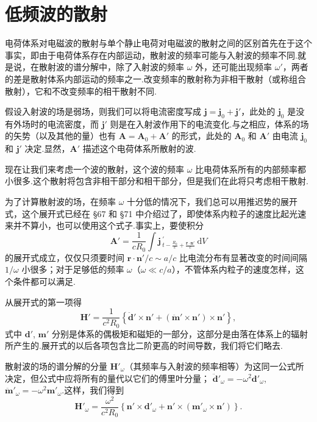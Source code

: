 \section{低频波的散射}

电荷体系对电磁波的散射与单个静止电荷对电磁波的散射之间的区别首先在于这个事实，即由于电荷体系存在内部运动，散射波的频率可能与入射波的频率不同.就是说，在散射波的谱分解中，除了入射波的频率 $\omega$ 外，还可能出现频率 $\omega'$，两者的差是散射体系内部运动的频率之一.改变频率的散射称为非相干散射（或称组合散射），它和不改变频率的相干散射不同.

假设入射波的场是弱场，则我们可以将电流密度写成 $\boldsymbol{j}=\boldsymbol{j}_0+\boldsymbol{j}'$，此处的 $\boldsymbol{j}_0$ 是没有外场时的电流密度，而 $\boldsymbol{j}'$ 则是在入射波作用下的电流变化.与之相应，体系的场的矢势（以及其他的量）也有 $\boldsymbol{A}=\boldsymbol{A}_0+\boldsymbol{A}'$ 的形式，此处的 $\boldsymbol{A}_0$ 和 $\boldsymbol{A}'$ 由电流 $\boldsymbol{j}_0$ 和 $\boldsymbol{j}'$ 决定.显然，$\boldsymbol{A}'$ 描述这个电荷体系所散射的波.

现在让我们来考虑一个波的散射，这个波的频率 $\omega$ 比电荷体系所有的内部频率都小很多.这个散射将包含非相干部分和相干部分，但是我们在此将只考虑相干散射.

为了计算散射波的场，在频率 $\omega$ 十分低的情况下，我们总可以用推迟势的展开式，这个展开式已经在 §67 和 §71 中介绍过了，即使体系内粒子的速度比起光速来并不算小，也可以使用这个式子.事实上，要使积分
\begin{equation}
  \boldsymbol{A}'=\frac{1}{cR_0}\int
  \boldsymbol{j}\,_{t-\frac{R_0}{c}+\frac{\boldsymbol{r}\cdot\boldsymbol{n}'}{c}}^{\prime}\,
  \mathrm{d}V
\end{equation}
的展开式成立，仅仅只须要时间 $\boldsymbol{r}\cdot\boldsymbol{n}'/c\sim a/c$ 比电流分布有显著改变的时间间隔 $1/\omega$ 小很多；对于足够低的频率 $\omega$（$\omega\ll c/a$），不管体系内粒子的速度怎样，这个条件都可以满足.

从展开式的第一项得
\begin{equation*}
  \boldsymbol{H}'=\frac{1}{c^2R_0}
  \left\{\ddot{\boldsymbol{d}}'\times\boldsymbol{n}'
  +(\ddot{\boldsymbol{m}}'\times\boldsymbol{n}')\times\boldsymbol{n}'\right\},
\end{equation*}
式中 $\boldsymbol{d}'$, $\boldsymbol{m}'$ 分别是体系的偶极矩和磁矩的一部分，这部分是由落在体系上的辐射所产生的.展开式的以后各项包含比二阶更高的时间导数，我们将它们略去.

散射波的场的谱分解的分量 $\boldsymbol{H}'_{\omega}$（其频率与入射波的频率相等）为这同一公式所决定，但公式中应将所有的量代以它们的傅里叶分量；
$\ddot{\boldsymbol{d}}'_{\omega}=-\omega^2\boldsymbol{d}'_{\omega}$,
$\ddot{\boldsymbol{m}}'_{\omega}=-\omega^2\boldsymbol{m}'_{\omega}$.这样，我们得到
\begin{equation}
  \boldsymbol{H}'_{\omega}=\frac{\omega^2}{c^2R_0}
  \left\{\boldsymbol{n}'\times\boldsymbol{d}'_{\omega}
  +\boldsymbol{n}'\times(\boldsymbol{m}'_{\omega}\times\boldsymbol{n}')\right\}.
\end{equation}

